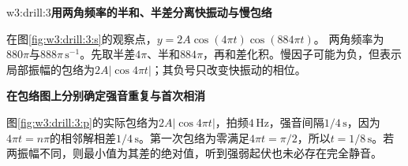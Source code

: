 \begin{drillsolution}{w3:drill:3}\textbf{用两角频率的半和、半差分离快振动与慢包络}\par\nobreak
在图\ref{fig:w3:drill:3:s}的观察点，$y=2A\cos(4\pi t)\cos(884\pi t)$。
两角频率为$880\pi$与$888\pi\,\mathrm{s^{-1}}$。先取半差$4\pi$、半和$884\pi$，再和差化积。慢因子可能为负，但表示局部振幅的包络为$2A|\cos4\pi t|$；其负号只改变快振动的相位。



\par\medskip{}\noindent\textbf{在包络图上分别确定强音重复与首次相消}\par\nobreak
图\ref{fig:w3:drill:3:p}的实际包络为$2A|\cos4\pi t|$，拍频$4\,\mathrm{Hz}$，强音间隔$1/4\,\mathrm s$，因为$4\pi t=n\pi$的相邻解相差$1/4\,\mathrm s$。第一次包络为零满足$4\pi t=\pi/2$，所以$t=1/8\,\mathrm s$。若两振幅不同，则最小值为其差的绝对值，听到强弱起伏也未必存在完全静音。\end{drillsolution}
